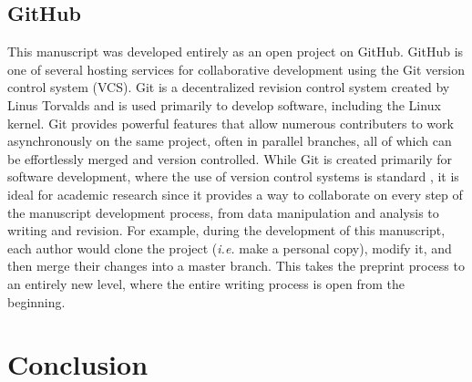 \documentclass[letterpaper,twocolumn,superscriptaddress,showkeys,longbibliography]{revtex4-1}
\begin{document}
\subsection{GitHub}

This manuscript was developed entirely as an open project on GitHub. GitHub is
one of several hosting services for collaborative development using the Git
version control system (VCS).  Git is a decentralized revision control system
created by Linus Torvalds and is used primarily to develop software, including
the Linux kernel. Git provides powerful features that allow numerous
contributers to work asynchronously on the same project, often in parallel
branches, all of which can be effortlessly merged and version controlled.  While
Git is created primarily for software development, where the use of version
control systems is standard \cite{aru12}, it is ideal for academic research
since it provides a way to collaborate on every step of the manuscript
development process, from data manipulation and analysis to writing and
revision. For example, during the development of this manuscript, each author
would clone the project (\emph{i.e.} make a personal copy), modify it, and then
merge their changes into a master branch. This takes the preprint process to an
entirely new level, where the entire writing process is open from the beginning.

\section{Conclusion}

\end{document}
